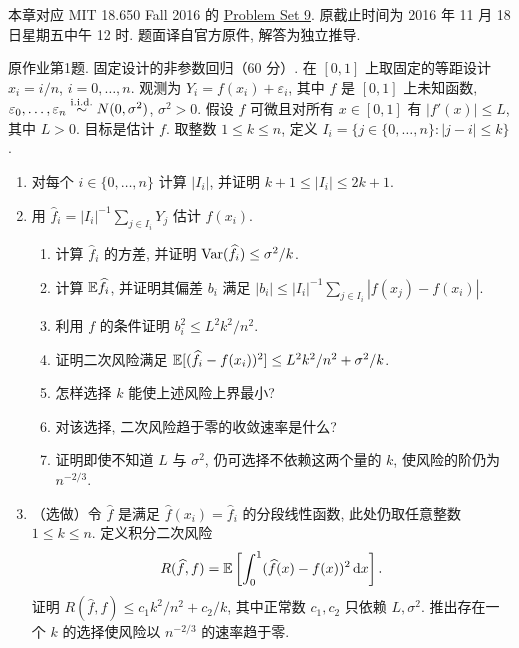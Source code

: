 \label{chap:ps09}
本章对应 MIT 18.650 Fall 2016 的 \href{https://ocw.mit.edu/courses/18-650-statistics-for-applications-fall-2016/resources/problem-set-9/}{Problem Set 9}. 原截止时间为 2016 年 11 月 18 日星期五中午 12 时. 题面译自官方原件, 解答为独立推导.

\begin{exercise}\label{ps09:p01}
原作业第1题. 固定设计的非参数回归（60 分）.
在 $[0,1]$ 上取固定的等距设计 $x_i=i/n$, $i=0,\ldots,n$. 观测为 $Y_i=f(x_i)+\varepsilon_i$, 其中 $f$ 是 $[0,1]$ 上未知函数, $\varepsilon_0,\ldots,\varepsilon_n\stackrel{\mathrm{i.i.d.}}{\sim} N(0,\sigma^2)$, $\sigma^2>0$. 假设 $f$ 可微且对所有 $x\in[0,1]$ 有 $|f'(x)|\le L$, 其中 $L>0$. 目标是估计 $f$. 取整数 $1\le k\le n$, 定义 $I_i=\{j\in\{0,\ldots,n\}:|j-i|\le k\}$.
\begin{enumerate}[label=\arabic*.]
\item 对每个 $i\in\{0,\ldots,n\}$ 计算 $|I_i|$, 并证明 $k+1\le |I_i|\le2k+1$.
\item 用 $\widehat f_i=|I_i|^{-1}\sum_{j\in I_i}Y_j$ 估计 $f(x_i)$.
\begin{enumerate}[label=\alph*)]
\item 计算 $\widehat f_i$ 的方差, 并证明 $\operatorname{Var}(\widehat f_i)\le\sigma^2/k$.
\item 计算 $\mathbb E\widehat f_i$, 并证明其偏差 $b_i$ 满足 $|b_i|\le |I_i|^{-1}\sum_{j\in I_i}|f(x_j)-f(x_i)|$.
\item 利用 $f$ 的条件证明 $b_i^2\le L^2k^2/n^2$.
\item 证明二次风险满足 $\mathbb E[(\widehat f_i-f(x_i))^2]\le L^2k^2/n^2+\sigma^2/k$.
\item 怎样选择 $k$ 能使上述风险上界最小?
\item 对该选择, 二次风险趋于零的收敛速率是什么?
\item 证明即使不知道 $L$ 与 $\sigma^2$, 仍可选择不依赖这两个量的 $k$, 使风险的阶仍为 $n^{-2/3}$.
\end{enumerate}
\item （选做）令 $\widehat f$ 是满足 $\widehat f(x_i)=\widehat f_i$ 的分段线性函数, 此处仍取任意整数 $1\le k\le n$. 定义积分二次风险
\[
R(\widehat f,f)=\mathbb E\left[\int_0^1(\widehat f(x)-f(x))^2\,\mathrm d x\right].
\]
证明 $R(\widehat f,f)\le c_1k^2/n^2+c_2/k$, 其中正常数 $c_1,c_2$ 只依赖 $L,\sigma^2$. 推出存在一个 $k$ 的选择使风险以 $n^{-2/3}$ 的速率趋于零.
\end{enumerate}
\end{exercise}
